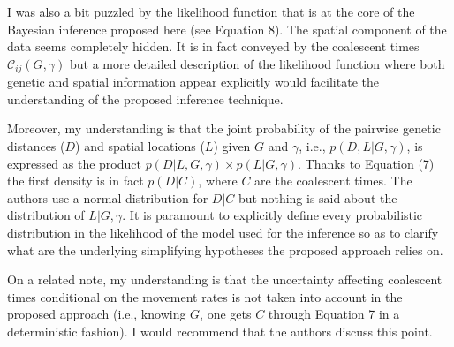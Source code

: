 
\begin{point}{}
    I was also a bit puzzled by the likelihood function that is at the core of the
    Bayesian inference proposed here (see Equation 8). The spatial component of
    the data seems completely hidden. It is in fact conveyed by the coalescent
    times $\mathcal{C}_{ij}(G,\gamma)$ but a more detailed description of the likelihood
    function where both genetic and spatial information appear explicitly would
    facilitate the understanding of the proposed inference technique.
\end{point}


\begin{point}{}
    Moreover, my understanding is that the joint probability of the pairwise genetic distances
    ($D$) and spatial locations ($L$) given $G$ and $\gamma$, i.e.,
    $p(D,L|G,\gamma)$, is expressed as the product 
    $p(D|L,G,\gamma) \times p(L|G,\gamma)$.  Thanks to Equation (7) the first density is in fact
    $p(D|C)$, where $C$ are the coalescent times. The authors use a normal distribution for $D|C$ but
    nothing is said  about the distribution of $L|G,\gamma$. It is paramount to explicitly define
    every probabilistic distribution in the likelihood of the model used for the inference so as
    to clarify what are the underlying simplifying hypotheses the proposed approach relies on.
\end{point}


\begin{point}{}
    On a related note, my understanding is that the uncertainty affecting
    coalescent times conditional on the movement rates is not taken into
    account in the proposed approach (i.e., knowing $G$, one gets $C$ through
    Equation 7 in a deterministic fashion). I would recommend that the authors
    discuss this point.
\end{point}

